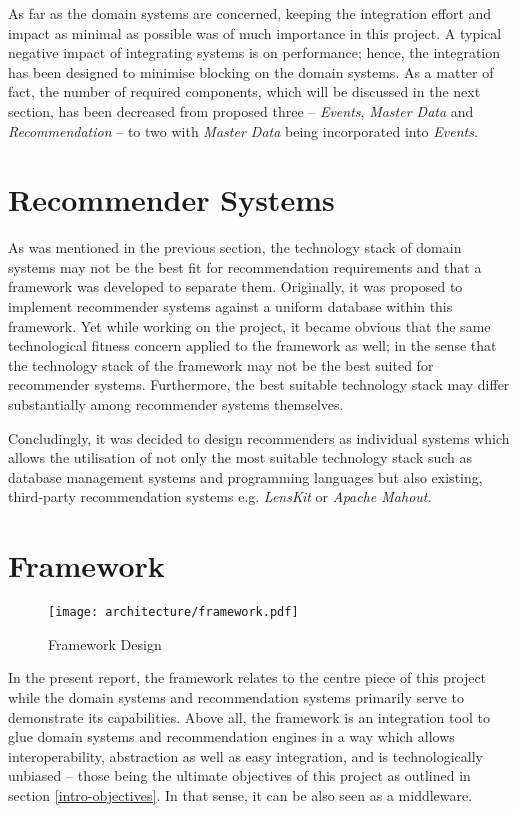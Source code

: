 As far as the domain systems are concerned, keeping the integration effort and impact as minimal as possible was of much importance in this project. A typical negative impact of integrating systems is on performance; hence, the integration has been designed to minimise blocking on the domain systems. As a matter of fact, the number of required components, which will be discussed in the next section, has been decreased from proposed three -- \emph{Events}, \emph{Master Data} and \emph{Recommendation} -- to two with \emph{Master Data} being incorporated into \emph{Events}.

\section{Recommender Systems}
\label{architecture-recommender-systems}

As was mentioned in the previous section, the technology stack of domain systems may not be the best fit for recommendation requirements and that a framework was developed to separate them. Originally, it was proposed to implement recommender systems against a uniform database within this framework. Yet while working on the project, it became obvious that the same technological fitness concern applied to the framework as well; in the sense that the technology stack of the framework may not be the best suited for recommender systems. Furthermore, the best suitable technology stack may differ substantially among recommender systems themselves.

Concludingly, it was decided to design recommenders as individual systems which allows the utilisation of not only the most suitable technology stack such as database management systems and programming languages but also existing, third-party recommendation systems e.g. \emph{LensKit} or \emph{Apache Mahout}.

\section{Framework}
\label{architecture-framework}

\begin{figure}[ht]
    \texttt{[image: architecture/framework.pdf]}
    \caption{Framework Design}
    \label{fig:architecture-framework}
\end{figure}

In the present report, the framework relates to the centre piece of this project while the domain systems and recommendation systems primarily serve to demonstrate its capabilities. Above all, the framework is an integration tool to glue domain systems and recommendation engines in a way which allows interoperability, abstraction as well as easy integration, and is technologically unbiased -- those being the ultimate objectives of this project as outlined in section \ref{intro-objectives}. In that sense, it can be also seen as a middleware.

